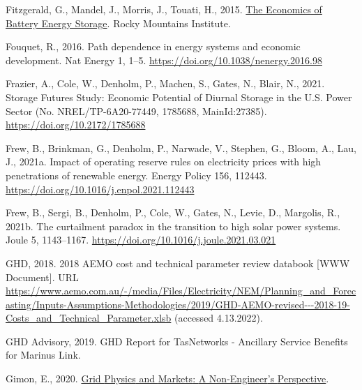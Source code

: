 \documentclass[12pt,a4paper,]{report}
\newlength{\cslhangindent}
\newenvironment{CSLReferences}[2] %
 {%
  \setlength{\parindent}{0pt}
  \ifodd #1 \everypar{\setlength{\hangindent}{\cslhangindent}}\ignorespaces\fi
  \ifnum #2 > 0
  \setlength{\parskip}{#2\baselineskip}
  \fi
 }%
 {}
\begin{document}
\begin{CSLReferences}{1}{0}
\leavevmode{}%
Fitzgerald, G., Mandel, J., Morris, J., Touati, H., 2015.
\href{https://rmi.org/insight/economics-battery-energy-storage/}{The
{Economics} of {Battery Energy Storage}}. Rocky Mountains Institute.

\leavevmode{}%
Fouquet, R., 2016. Path dependence in energy systems and economic
development. Nat Energy 1, 1--5.
\url{https://doi.org/10.1038/nenergy.2016.98}

\leavevmode{}%
Frazier, A., Cole, W., Denholm, P., Machen, S., Gates, N., Blair, N.,
2021. Storage {Futures Study}: {Economic Potential} of {Diurnal Storage}
in the {U}.{S}. {Power Sector} (No. NREL/TP-6A20-77449, 1785688,
MainId:27385). \url{https://doi.org/10.2172/1785688}

\leavevmode{}%
Frew, B., Brinkman, G., Denholm, P., Narwade, V., Stephen, G., Bloom,
A., Lau, J., 2021a. Impact of operating reserve rules on electricity
prices with high penetrations of renewable energy. Energy Policy 156,
112443. \url{https://doi.org/10.1016/j.enpol.2021.112443}

\leavevmode{}%
Frew, B., Sergi, B., Denholm, P., Cole, W., Gates, N., Levie, D.,
Margolis, R., 2021b. The curtailment paradox in the transition to high
solar power systems. Joule 5, 1143--1167.
\url{https://doi.org/10.1016/j.joule.2021.03.021}

\leavevmode{}%
GHD, 2018. 2018 {AEMO} cost and technical parameter review databook
{[}WWW Document{]}. URL
\url{https://www.aemo.com.au/-/media/Files/Electricity/NEM/Planning_and_Forecasting/Inputs-Assumptions-Methodologies/2019/GHD-AEMO-revised---2018-19-Costs_and_Technical_Parameter.xlsb}
(accessed 4.13.2022).

\leavevmode{}%
GHD Advisory, 2019. {GHD Report} for {TasNetworks} - {Ancillary Service
Benefits} for {Marinus Link}.

\leavevmode{}%
Gimon, E., 2020.
\href{https://www.esig.energy/download/plenary-1-grid-physics-and-markets-a-non-engineers-perspective-eric-gimon/}{Grid
{Physics} and {Markets}: {A Non-Engineer}'s {Perspective}}.


\end{CSLReferences}
\end{document}
